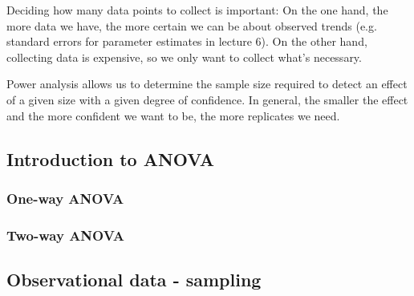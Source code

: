 Deciding how many data points to collect is important: On the one hand, the more data we have, the more certain we can be about observed trends (e.g. standard errors for parameter estimates in lecture 6). On the other hand, collecting data is expensive, so we only want to collect what's necessary.

Power analysis allows us to determine the sample size required to detect an effect of a given size with a given degree of confidence. In general, the smaller the effect and the more confident we want to be, the more replicates we need.

\subsection{Introduction to ANOVA}

\subsubsection{One-way ANOVA}

\subsubsection{Two-way ANOVA}

\subsection{Observational data - sampling}